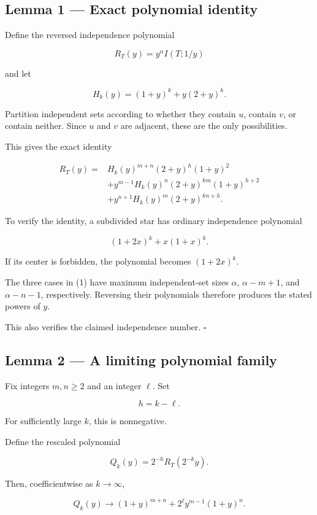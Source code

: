 \documentclass[11pt]{article}
\begin{document}
\subsection{Lemma 1 --- Exact polynomial identity}

Define the reversed independence polynomial

\[
R_T(y)=y^\alpha I(T;1/y)
\]

and let

\[
H_k(y)=(1+y)^k+y(2+y)^k.
\]

Partition independent sets according to whether they contain \(u\), contain \(v\), or contain neither. Since \(u\) and \(v\) are adjacent, these are the only possibilities.

This gives the exact identity

\[
\begin{aligned}
R_T(y)={}&H_k(y)^{m+n}(2+y)^h(1+y)^2\\
&+y^{m-1}H_k(y)^n
(2+y)^{km}(1+y)^{h+2}\\
&+y^{n+1}H_k(y)^m(2+y)^{kn+h}.
\end{aligned}
\tag{1}
\]

To verify the identity, a subdivided star has ordinary independence polynomial

\[
(1+2x)^k+x(1+x)^k.
\]

If its center is forbidden, the polynomial becomes \((1+2x)^k\).

The three cases in (1) have maximum independent-set sizes \(\alpha\), \(\alpha-m+1\), and \(\alpha-n-1\), respectively. Reversing their polynomials therefore produces the stated powers of \(y\).

This also verifies the claimed independence number. \(\square\)

\subsection{Lemma 2 --- A limiting polynomial family}

Fix integers \(m,n\geq2\) and an integer \(\ell\). Set

\[
h=k-\ell.
\]

For sufficiently large \(k\), this is nonnegative.

Define the rescaled polynomial

\[
Q_k(y)=2^{-h}R_T(2^{-k}y).
\]

Then, coefficientwise as \(k\to\infty\),

\[
\boxed{
Q_k(y)\longrightarrow
(1+y)^{m+n}
+2^\ell y^{m-1}(1+y)^n.
}
\tag{2}
\]
\end{document}
